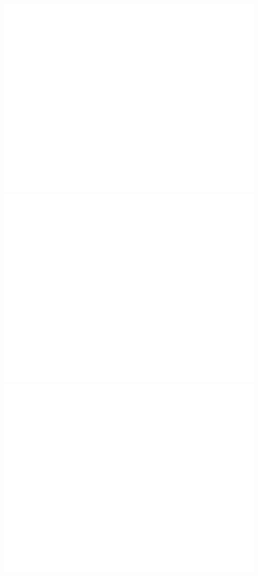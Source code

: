 \documentclass{article}
\begin{document}
\begin{center}
\includegraphics[scale=.9]{off_diag_5}
\includegraphics[scale=.9]{control_fid_6}
\includegraphics[scale=.9]{off_diag_6}

\end{center}
\end{document}
